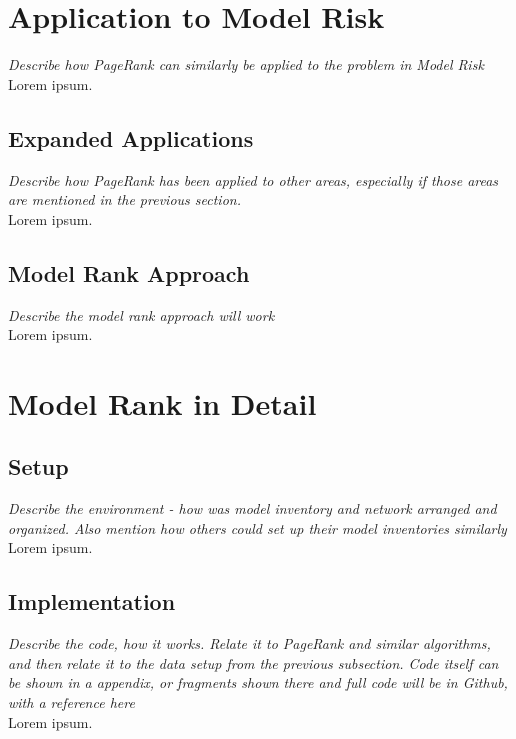 \documentclass[twoside,11pt]{article}
\begin{document}
\section{Application to Model Risk}
{\noindent \em Describe how PageRank can similarly be applied to the problem in Model Risk}\\
Lorem ipsum.\\

\subsection{Expanded Applications}
{\noindent \em Describe how PageRank has been applied to other areas, especially if those areas are mentioned in the previous section.}\\
Lorem ipsum.\\

\subsection{Model Rank Approach}
{\noindent \em Describe the model rank approach will work}\\
Lorem ipsum.\\


\section{Model Rank in Detail}

\subsection{Setup}
{\noindent \em Describe the environment - how was model inventory and network arranged and organized. Also mention how others could set up their model inventories similarly}\\
Lorem ipsum.\\

\subsection{Implementation}
{\noindent \em Describe the code, how it works. Relate it to PageRank and similar algorithms, and then relate it to the data setup from the previous subsection. Code itself can be shown in a appendix, or fragments shown there and full code will be in Github, with a reference here}\\
Lorem ipsum.\\
\end{document}
